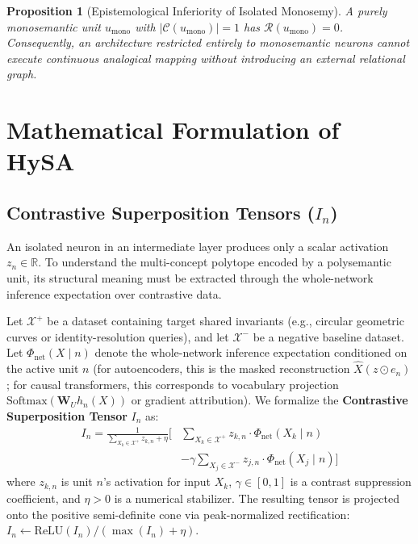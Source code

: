 \documentclass[11pt,a4paper]{article}
\newtheorem{proposition}{Proposition}
\theoremstyle{definition}
\begin{document}
\begin{proposition}[Epistemological Inferiority of Isolated Monosemy]
A purely monosemantic unit $u_{\mathrm{mono}}$ with $|\mathcal{C}(u_{\mathrm{mono}})| = 1$ has $\mathcal{R}(u_{\mathrm{mono}}) = 0$. Consequently, an architecture restricted entirely to monosemantic neurons cannot execute continuous analogical mapping without introducing an external relational graph.
\end{proposition}

\section{Mathematical Formulation of HySA}

\subsection{Contrastive Superposition Tensors (\texorpdfstring{$I_n$}{In})}
An isolated neuron in an intermediate layer produces only a scalar activation $z_n \in \mathbb{R}$. To understand the multi-concept polytope encoded by a polysemantic unit, its structural meaning must be extracted through the whole-network inference expectation over contrastive data.

Let $\mathcal{X}^+$ be a dataset containing target shared invariants (e.g., circular geometric curves or identity-resolution queries), and let $\mathcal{X}^-$ be a negative baseline dataset. Let $\Phi_{\mathrm{net}}(X \mid n)$ denote the whole-network inference expectation conditioned on the active unit $n$ (for autoencoders, this is the masked reconstruction $\hat{X}(z \odot e_n)$; for causal transformers, this corresponds to vocabulary projection $\mathrm{Softmax}(\mathbf{W}_U h_n(X))$ or gradient attribution). We formalize the \textbf{Contrastive Superposition Tensor} $I_n$ as:
\begin{equation}
\begin{aligned}
    I_n = \frac{1}{\sum_{X_k \in \mathcal{X}^+} z_{k,n} + \eta} \Bigg[ & \sum_{X_k \in \mathcal{X}^+} z_{k,n} \cdot \Phi_{\mathrm{net}}(X_k \mid n) \\
    & - \gamma \sum_{X_j \in \mathcal{X}^-} z_{j,n} \cdot \Phi_{\mathrm{net}}(X_j \mid n) \Bigg]
\end{aligned}
\label{eq:imprinted_tensor}
\end{equation}
where $z_{k,n}$ is unit $n$'s activation for input $X_k$, $\gamma \in [0, 1]$ is a contrast suppression coefficient, and $\eta > 0$ is a numerical stabilizer. The resulting tensor is projected onto the positive semi-definite cone via peak-normalized rectification: $I_n \leftarrow \mathrm{ReLU}(I_n) / (\max(I_n) + \eta)$.
\end{document}
